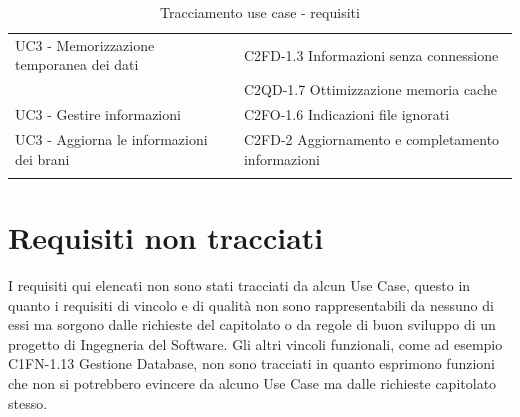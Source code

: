 \begin{footnotesize}
\begin{longtable}[!h]{|l|l|}
UC3 - Memorizzazione temporanea dei dati & C2FD-1.3 Informazioni senza
connessione \\
 & C2QD-1.7 Ottimizzazione memoria cache \\ \hline
UC3 - Gestire informazioni & C2FO-1.6 Indicazioni file ignorati \\ \hline
UC3 - Aggiorna le informazioni dei brani & C2FD-2 Aggiornamento e completamento
informazioni \\ \hline
\caption{Tracciamento use case - requisiti}
\end{longtable}
\end{footnotesize}

\newpage
\section{Requisiti non tracciati}

I requisiti qui elencati non sono stati tracciati da alcun Use Case, questo in
quanto i requisiti di vincolo e di qualit\`a non sono rappresentabili da nessuno
di essi ma sorgono dalle richieste del capitolato o da regole di buon sviluppo
di un progetto di Ingegneria del Software.
Gli altri vincoli funzionali, come ad esempio C1FN-1.13 Gestione Database, non sono
tracciati in quanto esprimono funzioni che non si potrebbero evincere da alcuno Use
Case ma dalle richieste capitolato stesso.


